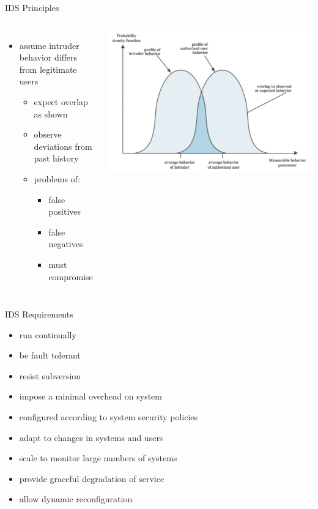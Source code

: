 \documentclass{beamer}
\begin{document}
\begin{frame}{IDS Principles}
  \begin{columns}[c]
  \begin{itemize}
  \item assume intruder behavior differs from legitimate 
    users 
    \begin{itemize}
    \item expect overlap as shown 
    \item observe deviations 
      from past history 
    \item problems of: 
      \begin{itemize}
      \item false positives 
      \item false negatives 
      \item must compromise 
      \end{itemize}
    \end{itemize}
  \end{itemize}
  \includegraphics[width=1\linewidth]{falsepositive}
  \end{columns}
\end{frame}

\begin{frame}{IDS Requirements}
  \begin{itemize}
  \item run continually 
  \item be fault tolerant 
  \item resist subversion 
  \item impose a minimal overhead on system 
  \item configured according to system security policies 
  \item adapt to changes in systems and users 
  \item scale to monitor large numbers of systems 
  \item provide graceful degradation of service 
  \item allow dynamic reconfiguration 
  \end{itemize}
\end{frame}
\end{document}
